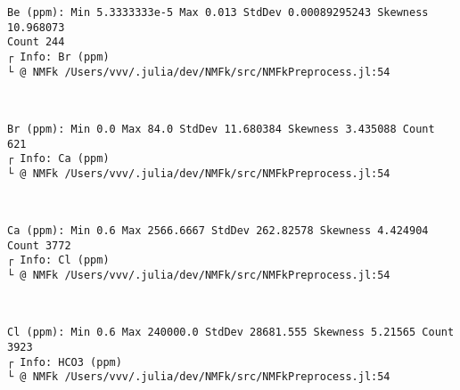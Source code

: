 \documentclass[11pt]{article}
\begin{document}
    \begin{Verbatim}[commandchars=\\\{\}]
Be (ppm): Min 5.3333333e-5 Max 0.013 StdDev 0.00089295243 Skewness 10.968073
Count 244
┌ Info: Br (ppm)
└ @ NMFk /Users/vvv/.julia/dev/NMFk/src/NMFkPreprocess.jl:54
    \end{Verbatim}

    \begin{center}
    \end{center}
    { \hspace*{\fill} \\}
    
    \begin{Verbatim}[commandchars=\\\{\}]
Br (ppm): Min 0.0 Max 84.0 StdDev 11.680384 Skewness 3.435088 Count 621
┌ Info: Ca (ppm)
└ @ NMFk /Users/vvv/.julia/dev/NMFk/src/NMFkPreprocess.jl:54
    \end{Verbatim}

    \begin{center}
    \end{center}
    { \hspace*{\fill} \\}
    
    \begin{Verbatim}[commandchars=\\\{\}]
Ca (ppm): Min 0.6 Max 2566.6667 StdDev 262.82578 Skewness 4.424904 Count 3772
┌ Info: Cl (ppm)
└ @ NMFk /Users/vvv/.julia/dev/NMFk/src/NMFkPreprocess.jl:54
    \end{Verbatim}

    \begin{center}
    \end{center}
    { \hspace*{\fill} \\}
    
    \begin{Verbatim}[commandchars=\\\{\}]
Cl (ppm): Min 0.6 Max 240000.0 StdDev 28681.555 Skewness 5.21565 Count 3923
┌ Info: HCO3 (ppm)
└ @ NMFk /Users/vvv/.julia/dev/NMFk/src/NMFkPreprocess.jl:54
    \end{Verbatim}
\end{document}
